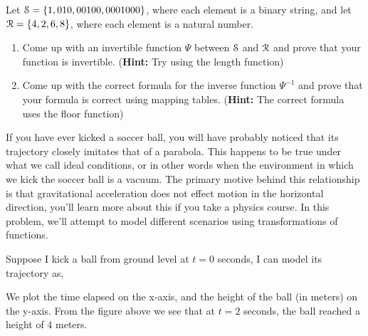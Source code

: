 \documentclass[12pt]{article} %
\begin{document}
\begin{qstn}
\begin{qstn}
  Let $\EuScript{S} = \{1,010,00100,0001000\}$, where each element is a binary string, and let $\EuScript{R} =
  \{4,2,6,8\}$, where each element is a natural number.
  \begin{enumerate}[label=(\alph*)]
    \item Come up with an invertible function $\Psi$ between $\EuScript{S}$ and $\EuScript{R}$ and prove that your
      function is invertible. (\textbf{Hint:} Try using the length function)
    \item Come up with the correct formula for the inverse function $\Psi^{-1}$ and prove that your formula is
      correct using mapping tables. (\textbf{Hint:} The correct formula uses the floor function)
  \end{enumerate}
\end{qstn}

\begin{qstn}
  If you have ever kicked a soccer ball, you will have probably noticed that its trajectory closely imitates that
  of a parabola. This happens to be true under what we call ideal conditions, or in other words when the
  environment in which we kick the soccer ball is a vacuum. The primary motive behind this relationship is that
  gravitational acceleration does not effect motion in the horizontal direction, you'll learn more about this if
  you take a physics course. In this problem, we'll attempt to model different scenarios using transformations of
  functions. 

  Suppose I kick a ball from ground level at $t = 0$ seconds, I can model its trajectory as,

\begin{center}
\end{center}

We plot the time elapsed on the x-axis, and the height of the ball (in meters) on the y-axis. From the
figure above we see that at $t = 2$ seconds, the ball reached a height of $4$ meters.


\end{qstn}
\end{qstn}
\end{document}
